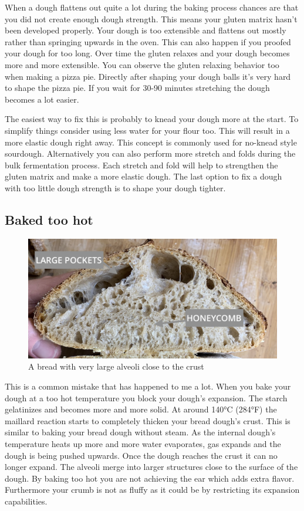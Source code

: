 When a dough flattens out quite a lot during the baking process chances are
that you did not create enough dough strength. This means your gluten matrix
hasn't been developed properly. Your dough is too extensible and flattens out
mostly rather than springing upwards in the oven. This can also happen if you
proofed your dough for too long. Over time the gluten relaxes and your dough
becomes more and more extensible. You can observe the gluten relaxing behavior
too when making a pizza pie. Directly after shaping your dough balls it's very hard to shape
the pizza pie. If you wait for 30-90 minutes stretching the dough becomes a lot easier.

The easiest way to fix this is probably to knead your dough more at the start. To simplify
things consider using less water for your flour too. This will result in a more elastic dough
right away. This concept is commonly used for no-knead style sourdough.  Alternatively you
can also perform more stretch and folds during the bulk fermentation process. Each
stretch and fold will help to strengthen the gluten matrix and make a more elastic dough.
The last option to fix a dough with too little dough strength is to shape your dough tighter.

\subsection{Baked too hot}

\begin{figure}
  \includegraphics[width=\textwidth]{baked-too-hot-v2}
  \caption{A bread with very large alveoli close to the crust}
  \label{baked-too-hot}
\end{figure}

This is a common mistake that has happened to me a lot. When you bake your dough
at a too hot temperature you block your dough's expansion. The starch gelatinizes
and becomes more and more solid. At around 140°C (284°F) the maillard reaction
starts to completely thicken your bread dough's crust. This is similar to baking
your bread dough without steam. As the internal dough's temperature heats up
more and more water evaporates, gas expands and the dough is being pushed upwards.
Once the dough reaches the crust it can no longer expand. The alveoli merge
into larger structures close to the surface of the dough. By baking too hot
you are not achieving the ear which adds extra flavor. Furthermore your crumb
is not as fluffy as it could be by restricting its expansion capabilities.


